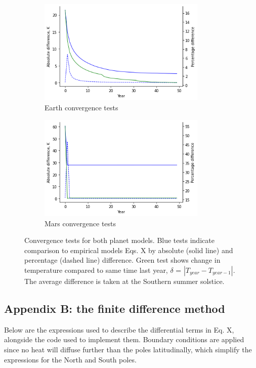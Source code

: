 \documentclass[12pt,onecolumn]{revtex4-2}    %
\begin{document}
\begin{figure}[H]
\begin{subfigure}{.5\textwidth}
  \centering
  \includegraphics[width = 8cm]{Convergence.png}
  \caption{Earth convergence tests}
  \label{fig:sub1}
\end{subfigure}%
\begin{subfigure}{.5\textwidth}
  \centering
  \includegraphics[width=8cm]{MarsConvergence.png}
  \caption{Mars convergence tests}
  \label{fig:sub2}
\end{subfigure}
\raggedright
\caption{Convergence tests for both planet models. Blue tests indicate comparison to empirical models Eqs. X by absolute (solid line) and percentage (dashed line) difference. Green test shows change in temperature compared to same time last year, $\delta$ = $|T_{year} - T_{year-1}|$. The average difference is taken at the Southern summer solstice.}
\label{fig:test}
\end{figure}

\newpage

\subsection{Appendix B: the finite difference method}

Below are the expressions used to describe the differential terms in Eq. X, alongside the code used to implement them. Boundary conditions are applied since no heat will diffuse further than the poles latitudinally, which simplify the expressions for the North and South poles. 
\end{document}
